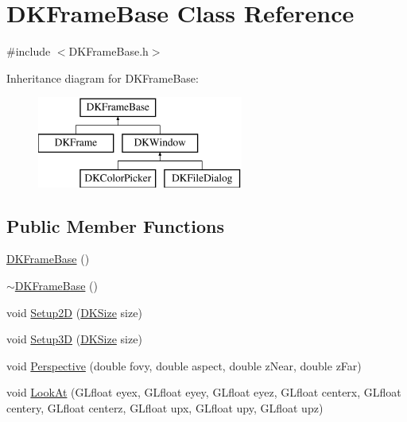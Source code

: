 \hypertarget{class_d_k_frame_base}{\section{D\-K\-Frame\-Base Class Reference}
\label{class_d_k_frame_base}
}


{\ttfamily \#include $<$D\-K\-Frame\-Base.\-h$>$}

Inheritance diagram for D\-K\-Frame\-Base\-:\begin{figure}[H]
\begin{center}
\leavevmode
\includegraphics[height=3.000000cm]{class_d_k_frame_base}
\end{center}
\end{figure}
\subsection*{Public Member Functions}
\begin{DoxyCompactItemize}
\item 
\hyperlink{class_d_k_frame_base_a40140099e8adad97b56fc8135867ec45}{D\-K\-Frame\-Base} ()
\item 
\hyperlink{class_d_k_frame_base_a1012235dec5d83a5583e5f453f2e2cf4}{$\sim$\-D\-K\-Frame\-Base} ()
\item 
void \hyperlink{class_d_k_frame_base_a4197c1b2fa4f8a75bea3f4972bf07e5e}{Setup2\-D} (\hyperlink{_d_k_axis_8h_aaa25a8c7cbf504fffdb8a4208ff7a731}{D\-K\-Size} size)
\item 
void \hyperlink{class_d_k_frame_base_ac497c0c63015b613dbbdcbe55396eb13}{Setup3\-D} (\hyperlink{_d_k_axis_8h_aaa25a8c7cbf504fffdb8a4208ff7a731}{D\-K\-Size} size)
\item 
void \hyperlink{class_d_k_frame_base_ac67e59e8e1f363b4d93a75b30f68c162}{Perspective} (double fovy, double aspect, double z\-Near, double z\-Far)
\item 
void \hyperlink{class_d_k_frame_base_abda2eb390b1c6230ee73e81c6f864d35}{Look\-At} (G\-Lfloat eyex, G\-Lfloat eyey, G\-Lfloat eyez, G\-Lfloat centerx, G\-Lfloat centery, G\-Lfloat centerz, G\-Lfloat upx, G\-Lfloat upy, G\-Lfloat upz)
\end{DoxyCompactItemize}
